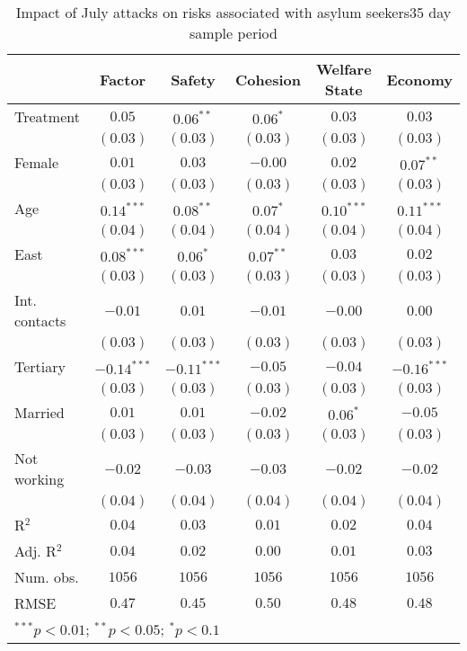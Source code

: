 
\begin{table}
\caption{Impact of July attacks on risks associated with asylum seekers35 day sample period}
\begin{center}
\begin{tabular}{l c c c c c}
\toprule
 & Factor & Safety & Cohesion & Welfare State & Economy \\
\midrule
Treatment     & $0.05$        & $0.06^{**}$   & $0.06^{*}$  & $0.03$       & $0.03$        \\
              & $(0.03)$      & $(0.03)$      & $(0.03)$    & $(0.03)$     & $(0.03)$      \\
Female        & $0.01$        & $0.03$        & $-0.00$     & $0.02$       & $0.07^{**}$   \\
              & $(0.03)$      & $(0.03)$      & $(0.03)$    & $(0.03)$     & $(0.03)$      \\
Age           & $0.14^{***}$  & $0.08^{**}$   & $0.07^{*}$  & $0.10^{***}$ & $0.11^{***}$  \\
              & $(0.04)$      & $(0.04)$      & $(0.04)$    & $(0.04)$     & $(0.04)$      \\
East          & $0.08^{***}$  & $0.06^{*}$    & $0.07^{**}$ & $0.03$       & $0.02$        \\
              & $(0.03)$      & $(0.03)$      & $(0.03)$    & $(0.03)$     & $(0.03)$      \\
Int. contacts & $-0.01$       & $0.01$        & $-0.01$     & $-0.00$      & $0.00$        \\
              & $(0.03)$      & $(0.03)$      & $(0.03)$    & $(0.03)$     & $(0.03)$      \\
Tertiary      & $-0.14^{***}$ & $-0.11^{***}$ & $-0.05$     & $-0.04$      & $-0.16^{***}$ \\
              & $(0.03)$      & $(0.03)$      & $(0.03)$    & $(0.03)$     & $(0.03)$      \\
Married       & $0.01$        & $0.01$        & $-0.02$     & $0.06^{*}$   & $-0.05$       \\
              & $(0.03)$      & $(0.03)$      & $(0.03)$    & $(0.03)$     & $(0.03)$      \\
Not working   & $-0.02$       & $-0.03$       & $-0.03$     & $-0.02$      & $-0.02$       \\
              & $(0.04)$      & $(0.04)$      & $(0.04)$    & $(0.04)$     & $(0.04)$      \\
\midrule
R$^2$         & $0.04$        & $0.03$        & $0.01$      & $0.02$       & $0.04$        \\
Adj. R$^2$    & $0.04$        & $0.02$        & $0.00$      & $0.01$       & $0.03$        \\
Num. obs.     & $1056$        & $1056$        & $1056$      & $1056$       & $1056$        \\
RMSE          & $0.47$        & $0.45$        & $0.50$      & $0.48$       & $0.48$        \\
\bottomrule
\multicolumn{6}{l}{\scriptsize{$^{***}p<0.01$; $^{**}p<0.05$; $^{*}p<0.1$}}
\end{tabular}
\label{tab_risk_35}
\end{center}
\end{table}
